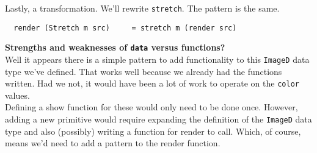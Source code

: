 \documentclass{article}
\begin{document}
\noindent Lastly, a transformation. We'll rewrite \lstinline{stretch}. The pattern is the same.
\begin{lstlisting}
  render (Stretch m src)     = stretch m (render src)
\end{lstlisting}

\noindent\textbf{Strengths and weaknesses of \lstinline{data} versus functions?}\\
Well it appears there is a simple pattern to add functionality to this \lstinline{ImageD}
data type we've defined. That works well because we already had the functions written.
Had we not, it would have been a lot of work to operate on the \lstinline{color} values.\\
Defining a show function for these would only need to be done once. However, adding a new
primitive would require expanding the definition of the \lstinline{ImageD} data type and
also (possibly) writing a function for render to call. Which, of course, means we'd need
to add a pattern to the render function.
\end{document}
